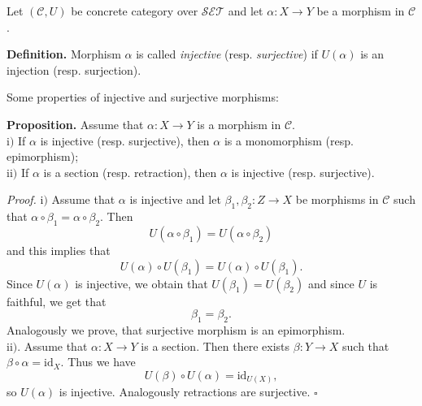 \documentclass[12pt]{article}
\begin{document}
Let $(\mathcal{C},U)$ be concrete category over $\mathcal{SET}$ and let $\alpha:X\to Y$ be a morphism in $\mathcal{C}$.

\textbf{Definition.} Morphism $\alpha$ is called \textit{injective} (resp. \textit{surjective}) if $U(\alpha)$ is an injection (resp. surjection).

Some properties of injective and surjective morphisms:

\textbf{Proposition.} Assume that $\alpha:X\to Y$ is a morphism in $\mathcal{C}$.\\
$\mathrm{i)}$ If $\alpha$ is injective (resp. surjective), then $\alpha$ is a monomorphism (resp. epimorphism);\\
$\mathrm{ii)}$ If $\alpha$ is a section (resp. retraction), then $\alpha$ is injective (resp. surjective).

\textit{Proof.} $\mathrm{i)}$ Assume that $\alpha$ is injective and let $\beta_1,\beta_2:Z\to X$ be morphisms in $\mathcal{C}$ such that $\alpha\circ\beta_1=\alpha\circ\beta_2$. Then $$U(\alpha\circ\beta_1)=U(\alpha\circ\beta_2)$$ and this implies that $$U(\alpha)\circ U(\beta_1)=U(\alpha)\circ U(\beta_1).$$
Since $U(\alpha)$ is injective, we obtain that $U(\beta_1)=U(\beta_2)$ and since $U$ is faithful, we get that $$\beta_1=\beta_2.$$
Analogously we prove, that surjective morphism is an epimorphism.\\

$\mathrm{ii)}$. Assume that $\alpha:X\to Y$ is a section. Then there exists $\beta:Y\to X$ such that $\beta\circ\alpha=\mathrm{id}_{X}$. Thus we have
$$U(\beta)\circ U(\alpha)=\mathrm{id}_{U(X)},$$
so $U(\alpha)$ is injective. Analogously retractions are surjective. $\square$
\end{document}
